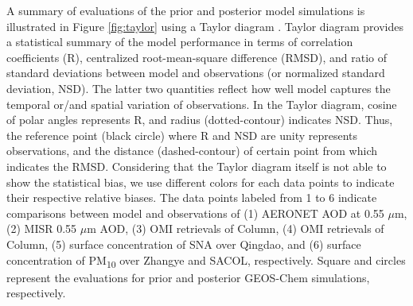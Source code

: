  A summary of evaluations of the prior and posterior model simulations
 is illustrated in Figure \ref{fig:taylor} using a Taylor diagram \citep{taylor01}.
 Taylor diagram provides a statistical summary of the model performance
 in terms of correlation coefficients (R), centralized root-mean-square difference (RMSD),
 and ratio of standard deviations between model and observations (or normalized standard deviation, NSD).
 The latter two quantities reflect how well model captures
 the temporal or/and spatial variation of observations.
 In the Taylor diagram, cosine of polar angles represents R, and radius (dotted-contour) indicates NSD.
 Thus, the reference point (black circle) where R and NSD are unity represents observations,
 and the distance (dashed-contour) of certain point from which indicates the RMSD.
 Considering that the Taylor diagram itself is not able to show the statistical bias,
 we use different colors for each data points to indicate their respective relative biases.
 The data points labeled from 1 to 6 indicate comparisons between model and observations of
 (1) AERONET AOD at 0.55 $\mu$m,
 (2) MISR 0.55 $\mu$m AOD,
 (3) OMI retrievals of  Column,
 (4) OMI retrievals of  Column,
 (5) surface concentration of SNA over Qingdao, and
 (6) surface concentration of PM\textsubscript{10} over Zhangye and SACOL, respectively.
 Square and circles represent the evaluations for prior and posterior GEOS-Chem simulations, respectively.

